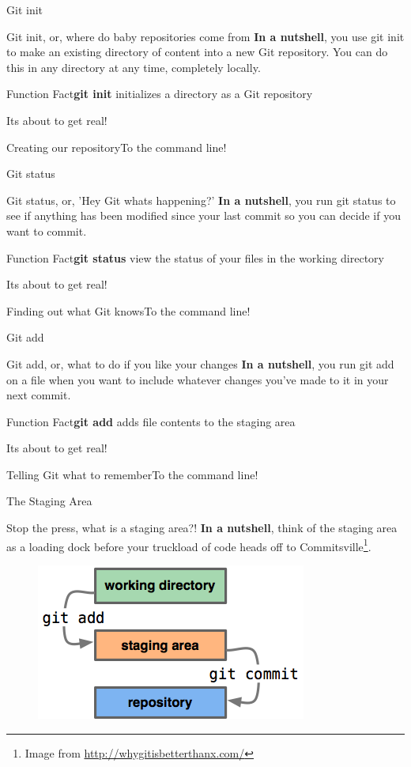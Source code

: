 \documentclass{beamer}
\newcommand{\demo}[1]{\begin{frame}{Its about to get real!}\begin{exampleblock}{#1}To the command line!\end{exampleblock}\end{frame}}
\newcommand{\clfact}[2]{\begin{alertblock}{Function Fact}\textbf{#1} #2\end{alertblock}}
\begin{document}
\begin{frame}{Git init}
    \begin{block}{Git init, or, where do baby repositories come from}
    \textbf{In a nutshell}, you use git init to make an existing directory of content into a new Git repository.
    You can do this in any directory at any time, completely locally.
    
    \end{block}
    \clfact{git init}{initializes a directory as a Git repository}
\end{frame}
\demo{Creating our repository}

\begin{frame}{Git status}
    \begin{block}{Git status, or, 'Hey Git whats happening?'}
    \textbf{In a nutshell}, you run git status to see if anything has been modified since your last commit so you can decide if you want to commit.
    
    \end{block}
    \clfact{git status}{view the status of your files in the working directory}
\end{frame}
\demo{Finding out what Git knows}

\begin{frame}{Git add}
    \begin{block}{Git add, or, what to do if you like your changes}
    \textbf{In a nutshell}, you run git add on a file when you want to include whatever changes you've made to it in your next commit.
    
    \end{block}
    \clfact{git add}{adds file contents to the staging area}
\end{frame}
\demo{Telling Git what to remember}

\begin{frame}{The Staging Area}
    \begin{block}{Stop the press, what is a staging area?!}
    \textbf{In a nutshell}, think of the staging area as a loading dock before your truckload of code heads off to Commitsville\footnote{Image from \href{http://whygitisbetterthanx.com/}{http://whygitisbetterthanx.com/}}.
    \begin{figure}[ht]
        \centering
        \includegraphics[width=0.5\linewidth]{img/staging.png}
        \label{fig:figure3}
    \end{figure}
    \end{block}
\end{frame}
\end{document}
